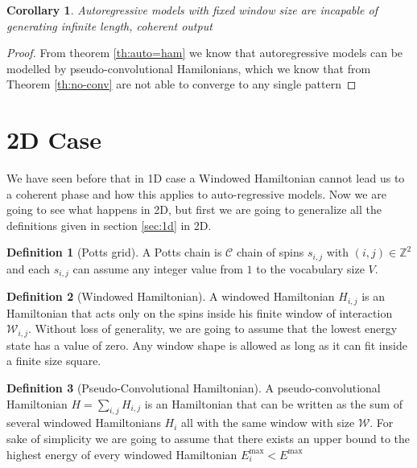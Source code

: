 \documentclass{article}
\newtheorem{corollary}{Corollary}[theorem]
\theoremstyle{definition}
\newtheorem{definition}{Definition}[section]
\theoremstyle{remark}
\begin{document}
\begin{corollary}
    Autoregressive models with fixed window size are incapable of generating infinite length, coherent output
\end{corollary}
\begin{proof}
    From theorem \ref{th:auto=ham} we know that autoregressive models can be modelled by pseudo-convolutional Hamilonians, which we know that from Theorem \ref{th:no-conv} are not able to converge to any single pattern
\end{proof}

\section{2D Case}
We have seen before that in 1D case a Windowed Hamiltonian cannot lead us to a coherent phase and how this applies to auto-regressive models. Now we are going to see what happens in 2D, but first we are going to generalize all the definitions given in section \ref{sec:1d} in 2D.

\begin{definition}[Potts grid]
    A Potts chain is $\mathcal C$ chain of spins $s_{i,j}$ with $(i,j) \in \mathds{Z}^2$ and each $s_{i,j}$ can assume any integer value from $1$ to the vocabulary size $V$.
\end{definition}
\begin{definition}[Windowed Hamiltonian]
    A windowed Hamiltonian $H_{i,j}$ is an Hamiltonian that acts only on the spins inside his finite window of interaction $\mathcal W_{i,j}$. Without loss of generality, we are going to assume that the lowest energy state has a value of zero. Any window shape is allowed as long as it can fit inside a finite size square.
\end{definition}
\begin{definition}[Pseudo-Convolutional Hamiltonian]
    A pseudo-convolutional Hamiltonian $H=\sum_{i,j} H_{i,j}$ is an Hamiltonian that can be written as the sum of several windowed Hamiltonians $H_i$ all with the same window with size $\mathcal W$. For sake of simplicity we are going to assume that there exists an upper bound to the highest energy of every windowed Hamiltonian $E^\textrm{max}_i<E^\textrm{max}$
\end{definition}
\end{document}
